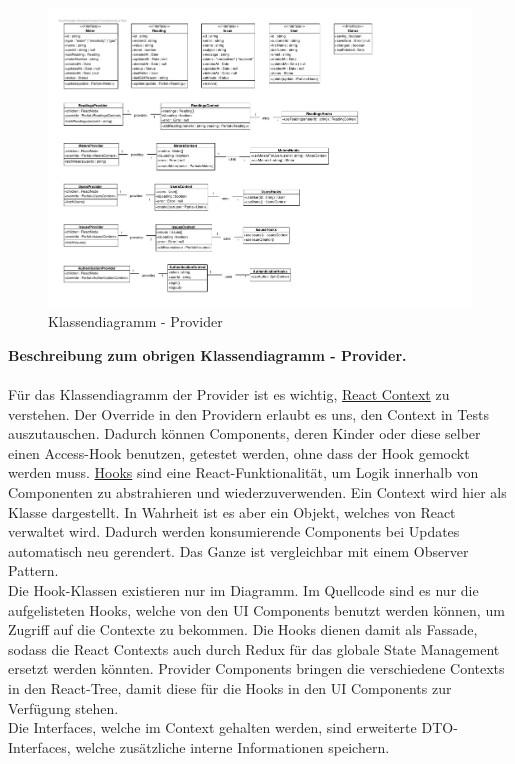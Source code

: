 \begin{figure}[H]
	\hspace{-3cm}
	\includegraphics[scale = 0.9]{./img/diagrams/providers-classDiagram}
	\caption{Klassendiagramm - Provider}
\end{figure}
\newpage

\textbf{Beschreibung zum obrigen Klassendiagramm - Provider.} \\ \\
Für das Klassendiagramm der Provider ist es wichtig, \href{https://reactjs.org/docs/context.html}{React Context} zu verstehen.  Der Override in den Providern erlaubt es uns, den Context in Tests auszutauschen. Dadurch können Components, deren Kinder oder diese selber einen Access-Hook  benutzen, getestet werden, ohne dass der Hook gemockt werden muss. \href{https://reactjs.org/docs/hooks-intro.html}{Hooks} sind eine React-Funktionalität, um Logik innerhalb von Componenten zu abstrahieren und wiederzuverwenden. Ein Context wird hier als Klasse dargestellt. In Wahrheit ist es aber ein Objekt, 
welches von React verwaltet wird. Dadurch werden konsumierende Components bei Updates automatisch neu gerendert. Das Ganze ist vergleichbar mit einem Observer Pattern. \\
Die Hook-Klassen existieren nur im Diagramm. Im Quellcode sind es nur die aufgelisteten Hooks, welche von den UI Components benutzt werden können, um Zugriff auf die Contexte zu bekommen. Die Hooks dienen damit als Fassade, sodass die React Contexts auch durch Redux für das globale State Management ersetzt werden könnten.
Provider Components bringen die verschiedene Contexts in den React-Tree, damit diese für die Hooks in den UI Components zur Verfügung stehen.\\
Die Interfaces, welche im Context gehalten werden, sind erweiterte DTO-Interfaces, welche zusätzliche interne Informationen speichern.

